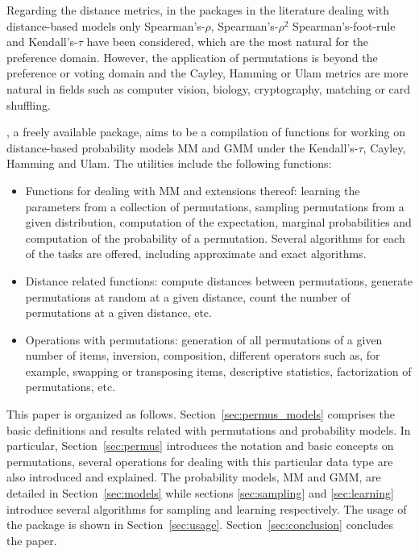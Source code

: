 \documentclass[article,nojss]{jss}
\begin{document}
Regarding the distance metrics, in the packages in the literature dealing with distance-based models only Spearman's-$\rho$, Spearman's-$\rho^2$ Spearman's-foot-rule and Kendall's-$\tau$  have been considered, which are the most natural for the preference domain. However, the application of permutations is beyond the preference or voting domain and the Cayley, Hamming or Ulam metrics are more natural in fields such as computer vision, biology, cryptography, matching or card shuffling. 

, a freely available  package, aims to be a compilation of functions for working on distance-based probability models MM and GMM under the Kendall's-$\tau$, Cayley, Hamming and Ulam. The utilities include the following functions:
\begin{itemize}
 \item Functions for dealing with MM and extensions thereof: learning the parameters from a  collection of permutations, sampling permutations from a given distribution, computation of the expectation, marginal probabilities and computation of the probability of a permutation. Several algorithms for each of the tasks are offered, including approximate and exact algorithms.
 \item Distance related functions: compute distances between permutations, generate permutations at random at a given distance, count the number of permutations at a given distance, etc.
 \item Operations with permutations: generation of all permutations of a given number of items, inversion, composition, different operators such as, for example, swapping or transposing items, descriptive statistics, factorization of permutations, etc.
\end{itemize}

This paper is organized as follows. Section~\ref{sec:permus_models} comprises the basic definitions and results related with permutations and probability models. In particular, Section~\ref{sec:permus} introduces the notation and basic concepts on permutations, several operations for dealing with this particular data type are also introduced and explained. The probability models, MM and GMM, are detailed in Section~\ref{sec:models} while sections \ref{sec:sampling} and \ref{sec:learning} introduce several algorithms for sampling and learning respectively. The usage of the  package is shown in Section~\ref{sec:usage}. Section~\ref{sec:conclusion} concludes the paper.
\end{document}
